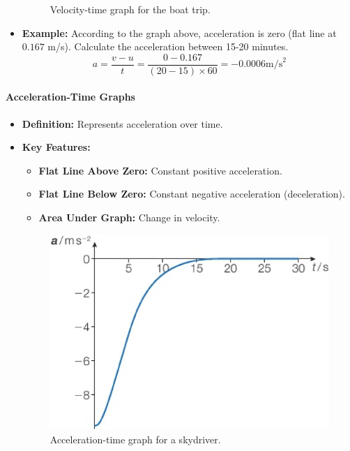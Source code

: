 \begin{itemize}
\begin{figure}[H]
        \caption{Velocity-time graph for the boat trip.}
    \end{figure}
    \item \textbf{Example:} According to the graph above, acceleration is zero (flat line at $0.167$ m/s). Calculate the
    acceleration between 15-20 minutes.
    \begin{equation}
        a = \frac{v - u}{t} = \frac{0 - 0.167}{\left(20 - 15\right) \times 60} = -0.0006 \text{m/s}^2
    \end{equation}
\end{itemize}

\paragraph{Acceleration-Time Graphs}
\begin{itemize}
    \item \textbf{Definition:} Represents acceleration over time.
    \item \textbf{Key Features:}
    \begin{itemize}
        \item \textbf{Flat Line Above Zero:} Constant positive acceleration.
        \item \textbf{Flat Line Below Zero:} Constant negative acceleration (deceleration).
        \item \textbf{Area Under Graph:} Change in velocity.
    \end{itemize}
    \begin{figure}[H]
        \centering
        \includegraphics[scale=0.1]{Physics/1A/Images/1A-2-3.png}
        \caption{Acceleration-time graph for a skydriver.}
    \end{figure}
\end{itemize}

